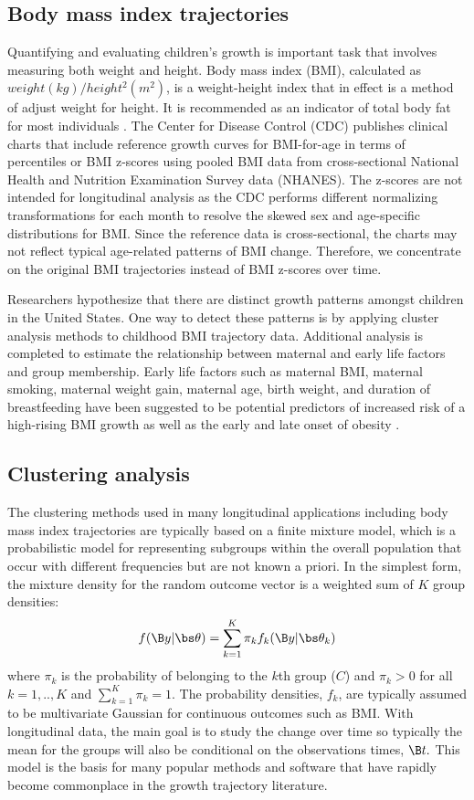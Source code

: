\subsection{Body mass index trajectories}
Quantifying and evaluating children's growth is important task that involves measuring both weight and height. Body mass index (BMI), calculated as $weight (kg)/height^{2} (m^{2})$, is a weight-height index that in effect is a method of adjust weight for height. It is recommended as an indicator of total body fat for most individuals \cite{roche1981}. The Center for Disease Control (CDC) publishes clinical charts that include reference growth curves for BMI-for-age in terms of percentiles or BMI z-scores using pooled BMI data from cross-sectional National Health and Nutrition Examination Survey data (NHANES). The z-scores are not intended for longitudinal analysis as the CDC performs different normalizing transformations for each month to resolve the skewed sex and age-specific distributions for BMI. Since the reference data is cross-sectional, the charts may not reflect typical age-related patterns of BMI change. Therefore, we concentrate on the original BMI trajectories instead of BMI z-scores over time.

Researchers hypothesize that there are distinct growth patterns amongst children in the United States. One way to detect these patterns is by applying cluster analysis methods to childhood BMI trajectory data. Additional analysis is completed to estimate the relationship between maternal and early life factors and group membership. Early life factors such as maternal BMI, maternal smoking, maternal weight gain, maternal age, birth weight, and duration of breastfeeding have been suggested to be potential predictors of increased risk of a high-rising BMI growth as well as the early and late onset of obesity \cite{pryor2011,carter2012,li2007}.

\subsection{Clustering analysis}
The clustering methods used in many longitudinal applications including body mass index trajectories are typically based on a finite mixture model, which is a probabilistic model for representing subgroups within the overall population that occur with different frequencies but are not known a priori. In the simplest form, the mixture density for the random outcome vector is a weighted sum of $K$ group densities:
$$f(\B y|\bs\theta) = \sum^{K}_{k=1}\pi_{k}f_{k}(\B y|\bs\theta_{k})$$
where $\pi_{k}$ is the probability of belonging to the $k$th group ($C$) and $\pi_{k}>0$ for all $k=1,..,K$ and $\sum^{K}_{k=1}\pi_{k}=1$. The probability densities, $f_{k}$, are typically assumed to be multivariate Gaussian for continuous outcomes such as BMI. With longitudinal data, the main goal is to study the change over time so typically the mean for the groups will also be conditional on the observations times, $\B t.$  This model is the basis for many popular methods and software that have rapidly become commonplace in the growth trajectory literature.

